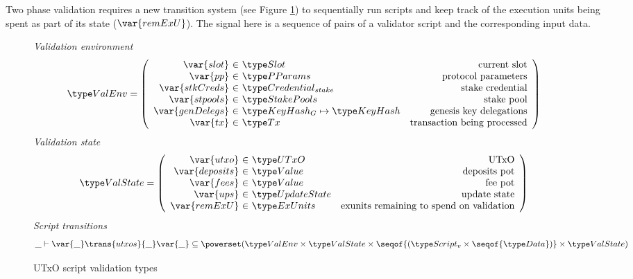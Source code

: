 Two phase validation requires a new transition system
(see Figure \ref{fig:ts-types:utxo-scripts}) to sequentially run
scripts and keep track of the execution units being spent as part of its state
($\var{remExU}$). The signal here is a sequence of pairs of a validator
script and the corresponding input data.

\begin{figure}[htb]
  \emph{Validation environment}
  \begin{equation*}
    \ValEnv =
    \left(
      \begin{array}{r@{~\in~}lr}
        \var{slot} & \Slot & \text{current slot}\\
        \var{pp} & \PParams & \text{protocol parameters}\\
        \var{stkCreds} & \StakeCredential & \text{stake credential}\\
        \var{stpools} & \StakePools & \text{stake pool}\\
        \var{genDelegs} & \KeyHashGen\mapsto\KeyHash & \text{genesis key delegations} \\
        \var{tx} & \Tx & \text{transaction being processed} \\
      \end{array}
    \right)
  \end{equation*}
  \emph{Validation state}
  \begin{equation*}
    \ValState =
    \left(
      \begin{array}{r@{~\in~}lr}
        \var{utxo} & \UTxO & \text{UTxO}\\
        \var{deposits} & \Value & \text{deposits pot}\\
        \var{fees} & \Value & \text{fee pot}\\
        \var{ups} & \UpdateState & \text{update state}\\
        \var{remExU} & \ExUnits & \text{exunits remaining to spend on validation} \\
      \end{array}
    \right)
  \end{equation*}
  \emph{Script transitions}
  \begin{equation*}
    \_ \vdash
    \var{\_} \trans{utxos}{\_} \var{\_}
    \subseteq \powerset (\ValEnv \times \ValState \times \seqof{(\ScriptV\times\seqof{\Data})} \times \ValState)
  \end{equation*}
  \caption{UTxO script validation types}
  \label{fig:ts-types:utxo-scripts}
\end{figure}

